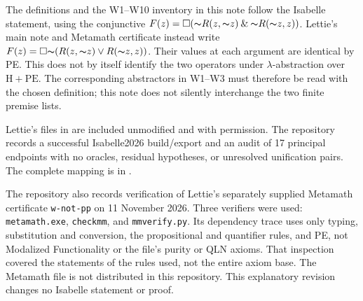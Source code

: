 \documentclass[12pt,leqno]{article}
\newcommand{\AND}{\ensuremath{\mathbin{\&}}}
\newcommand{\OR}{\ensuremath{\vee}}
\newcommand{\NOT}{\ensuremath{\text{$\thicksim$}}}
\newcommand{\HPE}{\ensuremath{\mathrm{H}+\mathrm{PE}}}
\theoremstyle{plain}
\begin{document}
\smallskip
The definitions and the W1--W10 inventory in this note follow the
Isabelle statement, using the conjunctive
\(F(z)=\Box(\NOT R(z,\NOT z)\AND\NOT R(\NOT z,z))\).
Lettie's main note and Metamath certificate instead write
\(F(z)=\Box\NOT(R(z,\NOT z)\OR R(\NOT z,z))\).
Their values at each argument are identical by PE. This does not by itself
identify the two operators under \(\lambda\)-abstraction over \HPE.
The corresponding abstractors in W1--W3 must therefore be read with the
chosen definition; this note does not silently interchange the two finite
premise lists.

Lettie's files in  are included unmodified and with
permission. The repository records a successful
Isabelle2026 build/export and an audit of 17 principal endpoints with no
oracles, residual hypotheses, or unresolved unification pairs.
The complete mapping is in
.

The repository also records verification of Lettie's separately supplied
Metamath certificate \texttt{w-not-pp} on 11 November 2026.
Three verifiers were used: \texttt{metamath.exe}, \texttt{checkmm}, and
\texttt{mmverify.py}.
Its dependency trace uses only typing, substitution and conversion,
the propositional and quantifier rules, and PE, not Modalized
Functionality or the file's purity or QLN axioms. That inspection covered
the statements of the rules used, not the entire axiom base.
The Metamath file is not distributed in this repository.
This explanatory revision changes no Isabelle statement or proof.
\end{document}
